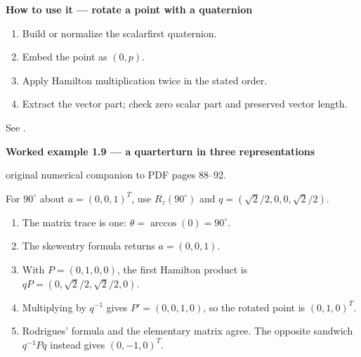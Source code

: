 \documentclass[letterpaper,11pt,english,openany,oneside]{jupyterBook}
\begin{document}
\begin{TextbookBox}
\textbf{How to use it — rotate a point with a quaternion}\par\smallskip
\begin{enumerate}
%
\item {}
\sphinxAtStartPar
Build or normalize the scalar\sphinxhyphen{}first quaternion.

\item {}
\sphinxAtStartPar
Embed the point as \((0,p)\).

\item {}
\sphinxAtStartPar
Apply Hamilton multiplication twice in the stated order.

\item {}
\sphinxAtStartPar
Extract the vector part; check zero scalar part and preserved vector length.

\end{enumerate}

\sphinxAtStartPar
See {\hyperref[\detokenize{lectures/lecture01/rotations:ex-lec01-quaternion}]{}}.

\end{TextbookBox}
\label{\detokenize{lectures/lecture01/rotations:ex-lec01-quaternion}}
\begin{TextbookBox}
\textbf{Worked example 1.9 — a quarter\sphinxhyphen{}turn in three representations}\par\smallskip

\sphinxAtStartPar
{} original numerical companion to PDF pages 88–92.

\sphinxAtStartPar
For \(90^\circ\) about \(a=(0,0,1)^T\), use \(R_z(90^\circ)\) and \(q=(\sqrt2/2,0,0,\sqrt2/2)\).
\begin{enumerate}
%
\item {}
\sphinxAtStartPar
The matrix trace is one: \(\theta=\arccos(0)=90^\circ\).

\item {}
\sphinxAtStartPar
The skew\sphinxhyphen{}entry formula returns \(a=(0,0,1)\).

\item {}
\sphinxAtStartPar
With \(P=(0,1,0,0)\), the first Hamilton product is \(qP=(0,\sqrt2/2,\sqrt2/2,0)\).

\item {}
\sphinxAtStartPar
Multiplying by \(q^{-1}\) gives \(P'=(0,0,1,0)\), so the rotated point is \((0,1,0)^T\).

\item {}
\sphinxAtStartPar
Rodrigues’ formula and the elementary matrix agree. The opposite sandwich \(q^{-1}Pq\) instead gives \((0,-1,0)^T\).

\end{enumerate}

\end{TextbookBox}
\end{document}
